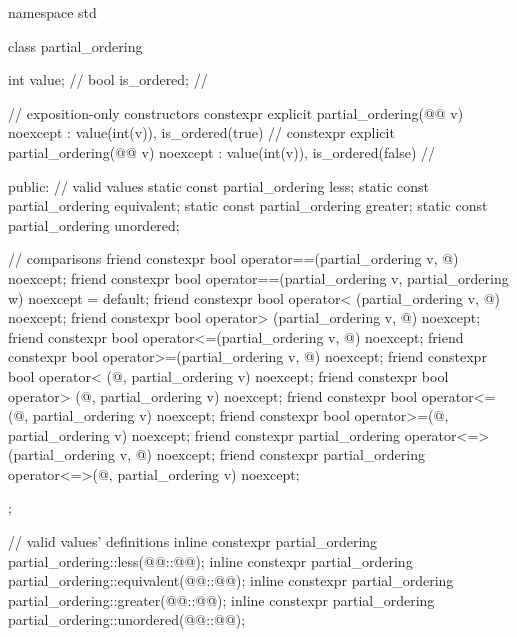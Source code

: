 %
%
%
%
%
\begin{codeblock}
namespace std {
  class partial_ordering {
    int value;          // \expos
    bool is_ordered;    // \expos

    // exposition-only constructors
    constexpr explicit
      partial_ordering(@@ v) noexcept : value(int(v)), is_ordered(true) {}     // \expos
    constexpr explicit
      partial_ordering(@@ v) noexcept : value(int(v)), is_ordered(false) {}   // \expos

  public:
    // valid values
    static const partial_ordering less;
    static const partial_ordering equivalent;
    static const partial_ordering greater;
    static const partial_ordering unordered;

    // comparisons
    friend constexpr bool operator==(partial_ordering v, @\unspec@) noexcept;
    friend constexpr bool operator==(partial_ordering v, partial_ordering w) noexcept = default;
    friend constexpr bool operator< (partial_ordering v, @\unspec@) noexcept;
    friend constexpr bool operator> (partial_ordering v, @\unspec@) noexcept;
    friend constexpr bool operator<=(partial_ordering v, @\unspec@) noexcept;
    friend constexpr bool operator>=(partial_ordering v, @\unspec@) noexcept;
    friend constexpr bool operator< (@\unspec@, partial_ordering v) noexcept;
    friend constexpr bool operator> (@\unspec@, partial_ordering v) noexcept;
    friend constexpr bool operator<=(@\unspec@, partial_ordering v) noexcept;
    friend constexpr bool operator>=(@\unspec@, partial_ordering v) noexcept;
    friend constexpr partial_ordering operator<=>(partial_ordering v, @\unspec@) noexcept;
    friend constexpr partial_ordering operator<=>(@\unspec@, partial_ordering v) noexcept;
  };

  // valid values' definitions
  inline constexpr partial_ordering partial_ordering::less(@@::@@);
  inline constexpr partial_ordering partial_ordering::equivalent(@@::@@);
  inline constexpr partial_ordering partial_ordering::greater(@@::@@);
  inline constexpr partial_ordering partial_ordering::unordered(@@::@@);
}
\end{codeblock}


